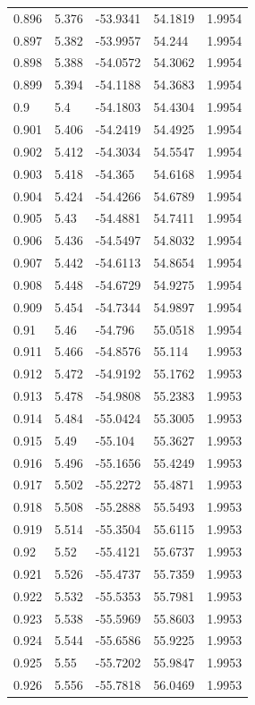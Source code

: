 \begin{tabular}{lllll}
0.896 & 5.376 & -53.9341 & 54.1819 & 1.9954 \\
0.897 & 5.382 & -53.9957 & 54.244 & 1.9954 \\
0.898 & 5.388 & -54.0572 & 54.3062 & 1.9954 \\
0.899 & 5.394 & -54.1188 & 54.3683 & 1.9954 \\
0.9 & 5.4 & -54.1803 & 54.4304 & 1.9954 \\
0.901 & 5.406 & -54.2419 & 54.4925 & 1.9954 \\
0.902 & 5.412 & -54.3034 & 54.5547 & 1.9954 \\
0.903 & 5.418 & -54.365 & 54.6168 & 1.9954 \\
0.904 & 5.424 & -54.4266 & 54.6789 & 1.9954 \\
0.905 & 5.43 & -54.4881 & 54.7411 & 1.9954 \\
0.906 & 5.436 & -54.5497 & 54.8032 & 1.9954 \\
0.907 & 5.442 & -54.6113 & 54.8654 & 1.9954 \\
0.908 & 5.448 & -54.6729 & 54.9275 & 1.9954 \\
0.909 & 5.454 & -54.7344 & 54.9897 & 1.9954 \\
0.91 & 5.46 & -54.796 & 55.0518 & 1.9954 \\
0.911 & 5.466 & -54.8576 & 55.114 & 1.9953 \\
0.912 & 5.472 & -54.9192 & 55.1762 & 1.9953 \\
0.913 & 5.478 & -54.9808 & 55.2383 & 1.9953 \\
0.914 & 5.484 & -55.0424 & 55.3005 & 1.9953 \\
0.915 & 5.49 & -55.104 & 55.3627 & 1.9953 \\
0.916 & 5.496 & -55.1656 & 55.4249 & 1.9953 \\
0.917 & 5.502 & -55.2272 & 55.4871 & 1.9953 \\
0.918 & 5.508 & -55.2888 & 55.5493 & 1.9953 \\
0.919 & 5.514 & -55.3504 & 55.6115 & 1.9953 \\
0.92 & 5.52 & -55.4121 & 55.6737 & 1.9953 \\
0.921 & 5.526 & -55.4737 & 55.7359 & 1.9953 \\
0.922 & 5.532 & -55.5353 & 55.7981 & 1.9953 \\
0.923 & 5.538 & -55.5969 & 55.8603 & 1.9953 \\
0.924 & 5.544 & -55.6586 & 55.9225 & 1.9953 \\
0.925 & 5.55 & -55.7202 & 55.9847 & 1.9953 \\
0.926 & 5.556 & -55.7818 & 56.0469 & 1.9953 \\

\end{tabular}
